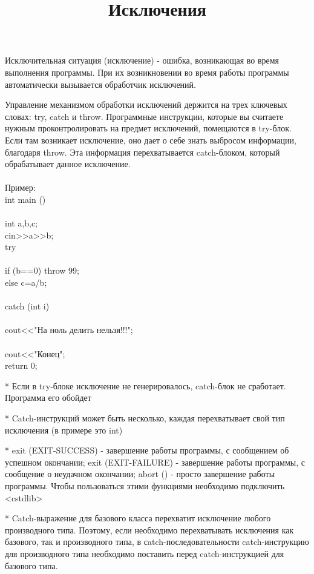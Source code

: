 \documentclass[a4paper,10pt]{article}
\title{Исключения}
\begin{document}
\maketitle

Исключительная ситуация (исключение) - ошибка, возникающая во время выполнения программы. При их возникновении во время работы программы автоматически вызывается обработчик исключений.

Управление механизмом обработки исключений держится на трех ключевых словах: try, catch и throw. Программные инструкции, которые вы считаете нужным проконтролировать на предмет исключений, помещаются в try-блок. Если там возникает исключение, оно дает о себе знать выбросом информации, благодаря throw. Эта информация перехватывается catch-блоком, который обрабатывает данное исключение.
\\
\\Пример: 
\\
int main ()
\\{
\\	int a,b,c;
\\	cin>>a>>b;
\\	try
\\	{
\\		if (b==0) throw 99;
\\		else c=a/b;
\\	}
\\	catch (int i)
\\	{
\\		cout<<"На ноль делить нельзя!!!";
\\}
\\	cout<<"Конец";
\\	return 0;
\\}


* Если в try-блоке исключение не генерировалось, catch-блок не сработает. Программа его обойдет

* Catch-инструкций может быть несколько, каждая перехватывает свой тип исключения (в примере это int)

* exit (EXIT-SUCCESS) - завершение работы программы, с сообщением об успешном окончании; exit (EXIT-FAILURE) - завершение работы программы, с сообщение о неудачном окончании; abort () - просто завершение работы программы. Чтобы пользоваться этими функциями необходимо подключить <cstdlib>

* Catch-выражение для базового класса перехватит исключение любого производного типа. Поэтому, если необходимо перехватывать исключения как базового, так и производного типа, в сatch-последовательности catch-инструкцию для производного типа необходимо поставить перед catch-инструкцией для базового типа.
\end{document}

